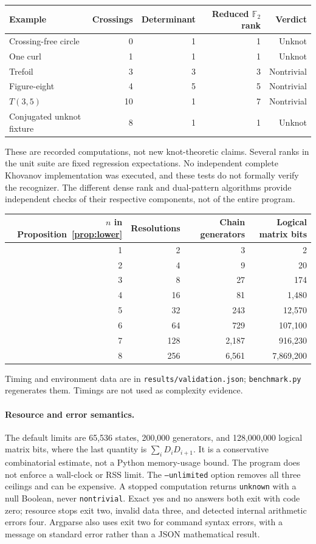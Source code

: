\documentclass[11pt]{article}
\theoremstyle{remark}\newtheorem{remark}[theorem]{Remark}
\newcommand{\F}{\mathbb F_2}
\newcommand{\code}[1]{\texttt{#1}}
\begin{document}
\begin{center}
\begin{tabular}{@{}lrrrr@{}}
\toprule
Example & Crossings & Determinant & Reduced $\F$ rank & Verdict\\
\midrule
Crossing-free circle & 0 & 1 & 1 & Unknot\\
One curl & 1 & 1 & 1 & Unknot\\
Trefoil & 3 & 3 & 3 & Nontrivial\\
Figure-eight & 4 & 5 & 5 & Nontrivial\\
$T(3,5)$ & 10 & 1 & 7 & Nontrivial\\
Conjugated unknot fixture & 8 & 1 & 1 & Unknot\\
\bottomrule
\end{tabular}
\end{center}
These are recorded computations, not new knot-theoretic claims. Several ranks
in the unit suite are fixed regression expectations. No independent complete
Khovanov implementation was executed, and these tests do not formally verify
the recognizer. The different dense rank and dual-pattern algorithms provide
independent checks of their respective components, not of the entire program.

\begin{center}
\begin{tabular}{@{}rrrr@{}}
\toprule
$n$ in Proposition~\ref{prop:lower} & Resolutions & Chain generators & Logical matrix bits\\
\midrule
1 & 2 & 3 & 2\\
2 & 4 & 9 & 20\\
3 & 8 & 27 & 174\\
4 & 16 & 81 & 1,480\\
5 & 32 & 243 & 12,570\\
6 & 64 & 729 & 107,100\\
7 & 128 & 2,187 & 916,230\\
8 & 256 & 6,561 & 7,869,200\\
\bottomrule
\end{tabular}
\end{center}
Timing and environment data are in \code{results/validation.json};
\code{benchmark.py} regenerates them. Timings are not used as complexity evidence.

\paragraph{Resource and error semantics.}
The default limits are 65,536 states, 200,000 generators, and 128,000,000
logical matrix bits, where the last quantity is
$\sum_iD_iD_{i+1}$. It is a conservative combinatorial estimate, not a Python
memory-usage bound. The program does not enforce a wall-clock or RSS limit.
The \code{--unlimited} option removes all three ceilings and can be expensive.
A stopped computation returns \code{unknown} with a null Boolean, never
\code{nontrivial}. Exact yes and no answers both exit with code zero; resource
stops exit two, invalid data three, and detected internal arithmetic errors
four. Argparse also uses exit two for command syntax errors, with a message on
standard error rather than a JSON mathematical result.
\end{document}
